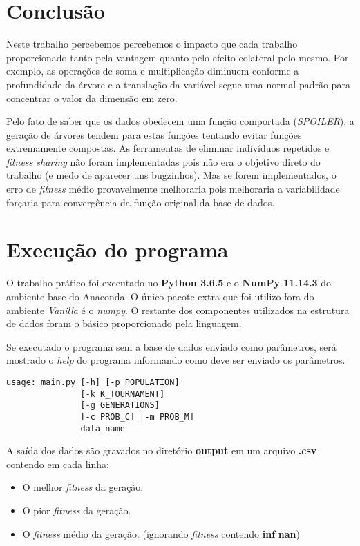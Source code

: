\section{Conclusão}

Neste trabalho percebemos percebemos o impacto que cada trabalho proporcionado tanto pela vantagem quanto pelo efeito colateral pelo mesmo.
Por exemplo, as operações de soma e multiplicação diminuem conforme a profundidade da árvore e a translação da variável segue uma normal padrão para concentrar o valor da dimensão em zero.


Pelo fato de saber que os dados obedecem uma função comportada (\textit{SPOILER}), a geração de árvores tendem para estas funções tentando evitar funções extremamente compostas.
As ferramentas de eliminar indivíduos repetidos e \textit{fitness sharing} não foram implementadas pois não era o objetivo direto do trabalho (e medo de aparecer uns bugzinhos). Mas  se forem implementados, o erro de \textit{fitness} médio provavelmente melhoraria pois melhoraria a variabilidade forçaria para convergência da função original da base de dados. 


\newpage
\section{Execução do programa}

O trabalho prático foi executado no \textbf{Python 3.6.5} e o \textbf{NumPy 11.14.3} do ambiente base do Anaconda. O único pacote extra que foi utilizo fora do ambiente \textit{Vanilla} é o \textit{numpy}. O restante dos componentes utilizados na estrutura de dados foram o básico proporcionado pela linguagem.

Se executado o programa sem a base de dados enviado como parâmetros, será mostrado o \textit{help} do programa informando como deve ser enviado os parâmetros.

\begin{lstlisting}
usage: main.py [-h] [-p POPULATION]
               [-k K_TOURNAMENT]
               [-g GENERATIONS]
               [-c PROB_C] [-m PROB_M]
               data_name
\end{lstlisting}

A saída dos dados são gravados no diretório \textbf{output} em um arquivo \textbf{.csv} contendo em cada linha:

\begin{itemize}
	\item O melhor \textit{fitness} da geração.
	\item O pior \textit{fitness} da geração.
	\item O \textit{fitness} médio da geração. (ignorando \textit{fitness} contendo \textbf{inf} \textbf{nan})
\end{itemize}

